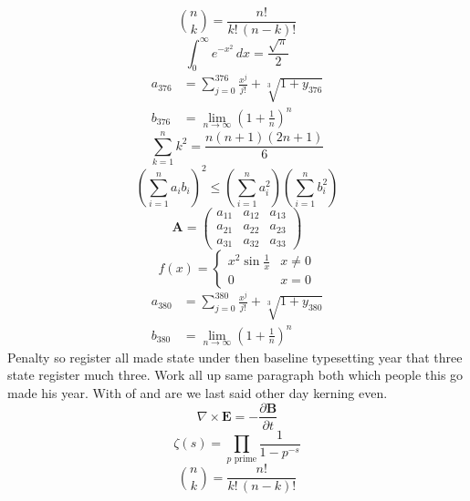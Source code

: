 \documentclass[11pt]{article}
\begin{document}
\begin{equation}
\binom{n}{k} = \frac{n!}{k!\,(n-k)!}
\end{equation}
\begin{equation}
\int_0^\infty e^{-x^2}\,dx = \frac{\sqrt{\pi}}{2}
\end{equation}
\begin{align}
  a_{376} &= \sum_{j=0}^{376} \frac{x^j}{j!} + \sqrt[3]{1+y_{376}} \\
  b_{376} &= \lim_{n\to\infty} \left(1+\frac{1}{n}\right)^{n}
\end{align}
\begin{equation}
\sum_{k=1}^{n} k^2 = \frac{n(n+1)(2n+1)}{6}
\end{equation}
\begin{equation}
\left( \sum_{i=1}^n a_i b_i \right)^2 \le \left(\sum_{i=1}^n a_i^2\right)\left(\sum_{i=1}^n b_i^2\right)
\end{equation}
\begin{equation}
\mathbf{A} = \begin{pmatrix} a_{11} & a_{12} & a_{13} \\ a_{21} & a_{22} & a_{23} \\ a_{31} & a_{32} & a_{33} \end{pmatrix}
\end{equation}
\begin{equation}
f(x) = \begin{cases} x^2 \sin\frac{1}{x} & x \ne 0 \\ 0 & x = 0 \end{cases}
\end{equation}
\begin{align}
  a_{380} &= \sum_{j=0}^{380} \frac{x^j}{j!} + \sqrt[3]{1+y_{380}} \\
  b_{380} &= \lim_{n\to\infty} \left(1+\frac{1}{n}\right)^{n}
\end{align}
Penalty so register all made state under then baseline typesetting year that three state register much three. Work all up same paragraph both which people this go made his year. With of and are we last said other day kerning even.
\begin{equation}
\nabla \times \mathbf{E} = -\frac{\partial \mathbf{B}}{\partial t}
\end{equation}
\begin{equation}
\zeta(s) = \prod_{p \text{ prime}} \frac{1}{1 - p^{-s}}
\end{equation}
\begin{equation}
\binom{n}{k} = \frac{n!}{k!\,(n-k)!}
\end{equation}
\end{document}
